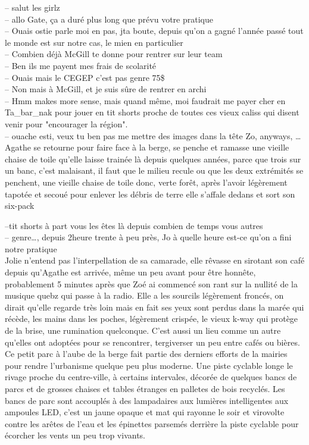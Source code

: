 \documentclass{article}
\begin{document}
-- salut les girlz\\
-- allo Gate, ça a duré plus long que prévu votre pratique\\
-- Ouais ostie parle moi en pas, jta boute, depuis qu'on a gagné
l'année passé tout le monde est sur notre cas, le mien en particulier\\
-- Combien déjà McGill te donne pour rentrer sur leur team \\
-- Ben ils me payent mes frais de scolarité\\
-- Ouais mais le CEGEP c'est pas genre 75\$\\
-- Non mais à McGill, et je suis sûre de rentrer en archi\\
-- Hmm makes more sense, mais quand même, moi faudrait me payer
cher en Ta\_bar\_nak pour jouer en tit shorts proche de toutes ces vieux caliss
qui disent venir pour "encourager la région". \\
-- ouache esti, veux tu ben pas me mettre des images dans la tête Zo,
anyways, \ldots \\[1ex]
Agathe se retourne pour faire face à la berge, se penche et ramasse une
vieille chaise de toile qu'elle laisse trainée là depuis quelques années,
parce que trois sur un banc, c'est malaisant, il faut que le milieu recule
ou que les deux extrémités se penchent, une vieille chaise de toile donc,
verte forêt, après l'avoir légèrement tapotée et secoué pour enlever les débris
de terre elle s'affale dedans et sort son six-pack




--tit shorts à part vous les êtes là depuis combien de temps vous
autres\\
-- genre\ldots, depuis 2heure trente à peu près, Jo à quelle
heure est-ce qu'on a fini notre pratique\\

Jolie n'entend pas l'interpellation de sa camarade, elle rêvasse en sirotant
son café depuis qu'Agathe est arrivée, même un peu avant pour être honnête,
probablement 5 minutes après que Zoé ai commencé son rant sur la nullité
de la musique quebz qui passe à la radio. Elle a les sourcils légèrement
froncés, on dirait qu'elle regarde très loin mais en fait ses yeux sont perdus
dans la marée qui récède, les mains dans les poches, légèrement crispée, le
vieux k-way qui protège de la brise, une rumination quelconque.
C'est aussi un lieu comme un autre qu'elles ont adoptées pour se rencontrer,
tergiverser un peu entre cafés ou bières. Ce petit parc à l'aube de la berge
fait partie des derniers efforts de la mairies pour rendre l'urbanisme quelque
peu plus moderne. Une piste cyclable longe le rivage proche du
centre-ville, à certains intervales, décorée de quelques bancs de parcs et
de grosses chaises et tables étranges en palletes de bois recyclés. Les bancs
de parc sont accouplés à des lampadaires aux lumières intelligentes aux ampoules
LED, c'est un jaune opaque et mat qui rayonne le soir et virovolte contre les
arêtes de l'eau et les épinettes parsemés derrière la piste cyclable pour
écorcher les vents un peu trop vivants. \\
\end{document}

